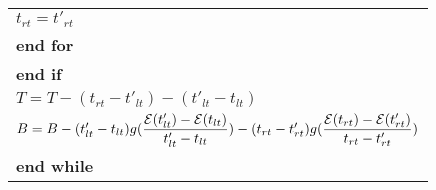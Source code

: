 \begin{table}
\begin{minipage}[b]{8cm}
\begin{tabular}{p{7cm}}
\hspace{7mm} $t_{rt} = t'_{rt}$
\\
\hspace{7mm}\textbf{end for}
\\
\hspace{4mm}\textbf{end if}
\\
\hspace{4mm} $T = T - (t_{rt}-t'_{lt}) - (t'_{lt} - t_{lt})$
\\
\hspace{4mm}$B = B -  (t'_{lt}-t_{lt})g(\dfrac{\mathcal{E}(t'_{lt})-\mathcal{E}(t_{lt})}{t'_{lt}-t_{lt}}) - (t_{rt}-t'_{rt})g(\dfrac{\mathcal{E}(t_{rt})-\mathcal{E}(t'_{rt})}{t_{rt}-t'_{rt}})$
\\
\textbf{end while}
\end{tabular}
\end{minipage}
\end{table}

